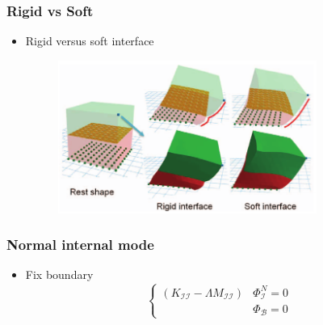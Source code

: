 \documentclass[serif,mathserif, 12pt]{beamer}
\begin{document}
\begin{frame}
  \frametitle{Rigid vs Soft}
  \begin{itemize}
  \item Rigid versus soft interface
    \begin{figure}
      \centering
      \includegraphics[width=0.8\textwidth]{img/soft_rigid_mode}
    \end{figure}
  \end{itemize}
\end{frame}

\begin{frame}
  \frametitle{Normal internal mode}
  \begin{itemize}
  \item Fix boundary
    \begin{equation*}
      \begin{cases}
        (K_{\mathcal{II}}-\Lambda M_{\mathcal{II}})&\Phi_{\mathcal{I}}^N = 0 \\
        &\Phi_{\mathcal{B}} = 0
      \end{cases}
    \end{equation*}
  \end{itemize}
\end{frame}
\end{document}
